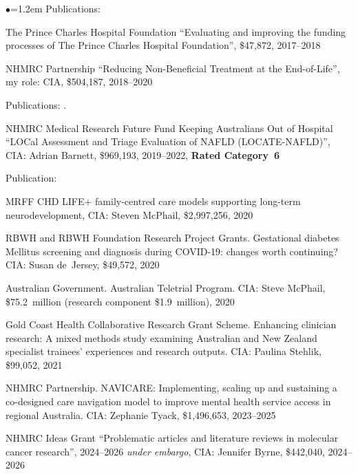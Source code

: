 \documentclass[a4paper,11pt]{article}
\renewcommand{\labelitemi}{$\bullet$}
\begin{document}
\begin{raggedright}
\begin{list}{\labelitemi}{\leftmargin=1.2em}
   Publications: 

\item The Prince Charles Hospital Foundation ``Evaluating and improving the funding processes of The Prince Charles Hospital Foundation'', \$47,872, 2017--2018

\item NHMRC Partnership ``Reducing Non-Beneficial Treatment at the End-of-Life'', my role: CIA, \$504,187, 2018--2020

Publications: .

\item NHMRC Medical Research Future Fund Keeping Australians Out of Hospital ``LOCal Assessment and Triage Evaluation of NAFLD (LOCATE-NAFLD)'', CIA: Adrian Barnett, \$969,193, 2019--2022, \textbf{Rated Category~6}

Publication: 

\item MRFF CHD LIFE+ family-centred care models supporting long-term neurodevelopment, CIA: Steven McPhail, \$2,997,256, 2020

\item RBWH and RBWH Foundation Research Project Grants. Gestational diabetes Mellitus screening and diagnosis during COVID-19: changes worth continuing? CIA: Susan de~Jersey, \$49,572, 2020

\item Australian Government. Australian Teletrial Program. CIA: Steve McPhail, \$75.2~million (research component \$1.9~million), 2020

\item Gold Coast Health Collaborative Research Grant Scheme. Enhancing clinician research: A mixed methods study examining Australian and New Zealand specialist trainees' experiences and research outputs. CIA: Paulina Stehlik, \$99,052, 2021 

\item NHMRC Partnership. NAVICARE: Implementing, scaling up and sustaining a co-designed care navigation model to improve mental health service access in regional Australia. CIA: Zephanie Tyack, \$1,496,653, 2023--2025

\item NHMRC Ideas Grant ``Problematic articles and literature reviews in molecular cancer research'', 2024--2026 \textit{under embargo}, CIA: Jennifer Byrne, \$442,040, 2024--2026


\end{list}
\end{raggedright}
\end{document}

